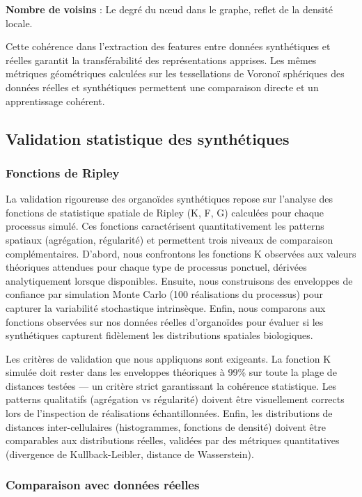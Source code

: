 \textbf{Nombre de voisins} : Le degré du nœud dans le graphe, reflet de la densité locale.

Cette cohérence dans l'extraction des features entre données synthétiques et réelles garantit la transférabilité des représentations apprises. Les mêmes métriques géométriques calculées sur les tessellations de Voronoï sphériques des données réelles et synthétiques permettent une comparaison directe et un apprentissage cohérent.

\subsection{Validation statistique des synthétiques}

\subsubsection{Fonctions de Ripley}

La validation rigoureuse des organoïdes synthétiques repose sur l'analyse des fonctions de statistique spatiale de Ripley (K, F, G) calculées pour chaque processus simulé. Ces fonctions caractérisent quantitativement les patterns spatiaux (agrégation, régularité) et permettent trois niveaux de comparaison complémentaires. D'abord, nous confrontons les fonctions K observées aux valeurs théoriques attendues pour chaque type de processus ponctuel, dérivées analytiquement lorsque disponibles. Ensuite, nous construisons des enveloppes de confiance par simulation Monte Carlo (100 réalisations du processus) pour capturer la variabilité stochastique intrinsèque. Enfin, nous comparons aux fonctions observées sur nos données réelles d'organoïdes pour évaluer si les synthétiques capturent fidèlement les distributions spatiales biologiques.

Les critères de validation que nous appliquons sont exigeants. La fonction K simulée doit rester dans les enveloppes théoriques à 99\% sur toute la plage de distances testées — un critère strict garantissant la cohérence statistique. Les patterns qualitatifs (agrégation vs régularité) doivent être visuellement corrects lors de l'inspection de réalisations échantillonnées. Enfin, les distributions de distances inter-cellulaires (histogrammes, fonctions de densité) doivent être comparables aux distributions réelles, validées par des métriques quantitatives (divergence de Kullback-Leibler, distance de Wasserstein).

\subsubsection{Comparaison avec données réelles}

